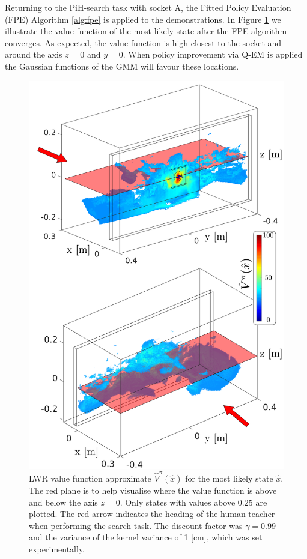 Returning to the PiH-search task with socket A, the Fitted Policy Evaluation (FPE) Algorithm \ref{alg:fpe} is applied to the 
demonstrations. In Figure \ref{fig:ch4:Figure1}  we illustrate the value function of the most likely state after the FPE algorithm converges. 
As expected, the value function is high closest to the socket and around the axis $z=0$ and $y=0$. 
When policy improvement via Q-EM is applied the Gaussian functions of the GMM will favour these locations. 

\begin{figure}
 \centering
 \includegraphics[width=\textwidth]{./ch4-PiH/Figures/ValueFunction/value_func_final_v2.pdf}
 \caption{LWR value function approximate $\hat{V}^{\pi}(\hat{x})$ for the most likely state $\hat{x}$. 
 The red plane is to help visualise where the value function is above and below the axis $z=0$. Only states with values above
 $0.25$ are plotted.  The red arrow indicates the heading of the human teacher when performing the search task. The discount 
 factor was $\gamma=0.99$ and the variance of the kernel variance of 1 [cm], which was set experimentally.
}
 \label{fig:ch4:Figure1}
\end{figure}

